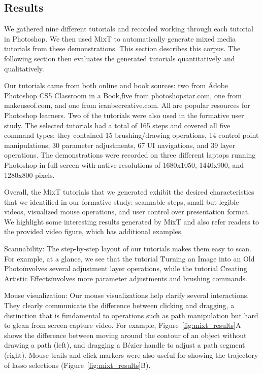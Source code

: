 \subsection{Results}

We gathered nine different tutorials and recorded working through each tutorial in Photoshop. We then used MixT to automatically generate mixed media tutorials from these demonstrations. This section describes this corpus. The following section then evaluates the generated tutorials quantitatively and qualitatively.

Our tutorials came from both online and book sources: two from \"Adobe Photoshop CS5 Classroom in a Book,\" five from photoshopstar.com, one from makeuseof.com, and one from icanbecreative.com. All are popular resources for Photoshop learners. Two of the tutorials were also used in the formative user study. The selected tutorials had a total of 165 steps and covered all five command types: they contained 15 brushing/drawing operations, 14 control point manipulations, 30 parameter adjustments, 67 UI navigations, and 39 layer operations. The demonstrations were recorded on three different laptops running Photoshop in full screen with native resolutions of 1680x1050, 1440x900, and 1280x800 pixels.

Overall, the MixT tutorials that we generated exhibit the desired characteristics that we identified in our formative study: scannable steps, small but legible videos, visualized mouse operations, and user control over presentation format. We highlight some interesting results generated by MixT and also refer readers to the provided video figure, which has additional examples.

Scannability: The step-by-step layout of our tutorials makes them easy to scan. For example, at a glance, we see that the tutorial \"Turning an Image into an Old Photo\" involves several adjustment layer operations, while the tutorial \"Creating Artistic Effects\" involves more parameter adjustments and brushing commands.

Mouse visualization: Our mouse visualizations help clarify several interactions. They clearly communicate the difference between clicking and dragging, a distinction that is fundamental to operations such as path manipulation but hard to glean from screen capture video. For example, Figure~\ref{fig:mixt_results}A shows the difference between moving around the contour of an object without drawing a path (left), and dragging a Bézier handle to adjust a path segment (right). Mouse trails and click markers were also useful for showing the trajectory of lasso selections (Figure~\ref{fig:mixt_results}B).

